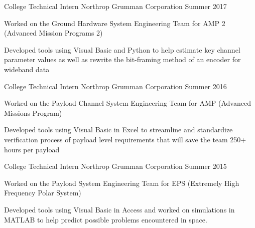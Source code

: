 \vspace{-2mm}


\begin{cventries}
  \cventry
    {College Technical Intern} %
    {Northrop Grumman Corporation} %
    {Summer 2017} %
    {} %
    {
      \begin{cvitems} %
        \item {Worked on the Ground Hardware System Engineering Team for AMP 2 (Advanced Mission Programs 2)}
        \item {Developed tools using Visual Basic and Python to help estimate key channel parameter values as well as rewrite the bit-framing method of an encoder for wideband data}
      \end{cvitems}
    }


  \cventry
    {College Technical Intern} %
    {Northrop Grumman Corporation} %
    {Summer 2016} %
    {} %
    {
      \begin{cvitems} %
        \item {Worked on the Payload Channel System Engineering Team for AMP (Advanced Missions Program)}
        \item {Developed tools using Visual Basic in Excel to streamline and standardize verification process of payload level requirements that will save the team 250+ hours per payload}
      \end{cvitems}
    }

  \cventry
    {College Technical Intern} %
    {Northrop Grumman Corporation} %
    {Summer 2015} %
    {} %
    {
      \begin{cvitems} %
        \item {Worked on the Payload System Engineering Team for EPS (Extremely High Frequency Polar System)}
        \item {Developed tools using Visual Basic in Access and worked on simulations in MATLAB to help predict possible problems encountered in space.}
      \end{cvitems}
    }


\end{cventries}
